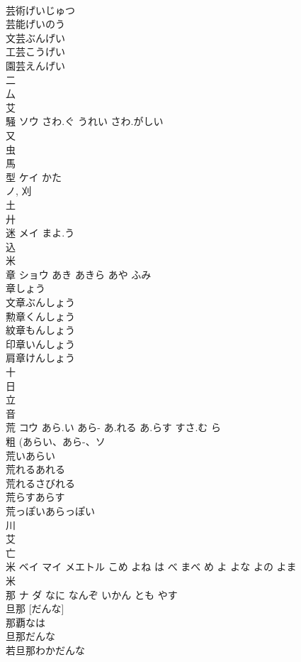 \documentclass[8pt]{extreport}
\begin{document}
\begin{CJK}{UTF8}{min}
\\	芸術げいじゅつ 
\\	芸能げいのう 
\\	文芸ぶんげい 
\\	工芸こうげい 
\\	園芸えんげい 
\\	二 
\\	厶 
\\	艾 
\\	騒	ソウ	さわ.ぐ うれい さわ.がしい	
\\	又 
\\	虫 
\\	馬 
\\	型	ケイ	かた	
\\	ノ, 刈 
\\	土 
\\	廾 
\\	迷	メイ	まよ.う	
\\	込 
\\	米 
\\	章	ショウ	あき あきら あや ふみ	
\\	章しょう
\\	文章ぶんしょう
\\	勲章くんしょう
\\	紋章もんしょう
\\	印章いんしょう
\\	肩章けんしょう
\\	十 
\\	日 
\\	立 
\\	音 
\\	荒	コウ	あら.い あら- あ.れる あ.らす すさ.む ら	
\\	粗 (あらい、あら-、ソ 
\\	荒いあらい
\\	荒れるあれる
\\	荒れるさびれる
\\	荒らすあらす
\\	荒っぽいあらっぽい
\\	川 
\\	艾 
\\	亡 
\\	米	ベイ マイ メエトル	こめ よね は べ まべ め よ よな よの よま	
\\	米 
\\	那	ナ ダ	なに なんぞ いかん とも やす	
\\	旦那 [だんな] 
\\	那覇なは
\\	旦那だんな
\\	若旦那わかだんな

\end{CJK}
\end{document}
